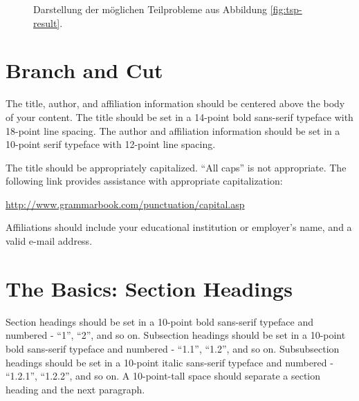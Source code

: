 \documentclass[tog]{acmsiggraph}
\begin{document}
\begin{figure}[ht]
\centering
{}
\caption{Darstellung der möglichen Teilprobleme aus Abbildung \ref{fig:tsp-result}.}
\label{fig:tsp-tree}
\end{figure}

\section{Branch and Cut}

















The title, author, and affiliation information should be centered
above the body of your content. The title should be set in a 14-point
bold sans-serif typeface with 18-point line spacing. The author and
affiliation information should be set in a 10-point serif typeface
with 12-point line spacing.

The title should be appropriately capitalized. ``All caps'' is not
appropriate. The following link provides assistance with appropriate
capitalization:

{\small\url{http://www.grammarbook.com/punctuation/capital.asp}}

Affiliations should include your educational institution or employer's
name, and a valid e-mail address.

\section{The Basics: Section Headings}

Section headings should be set in a 10-point bold sans-serif typeface
and numbered - ``1'', ``2'', and so on. Subsection headings should be
set in a 10-point bold sans-serif typeface and numbered - ``1.1'',
``1.2'', and so on. Subsubsection headings should be set in a 10-point
italic sans-serif typeface and numbered - ``1.2.1'', ``1.2.2'', and so
on. A 10-point-tall space should separate a section heading and the
next paragraph.
\end{document}

